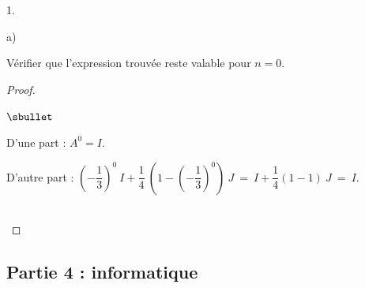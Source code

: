 \begin{noliste}{1.}
\begin{noliste}{a)}
  \item Vérifier que l'expression trouvée reste valable pour $n = 0$.

    \begin{proof}~%
      \begin{noliste}{$\sbullet$}
      \item D'une part : $A^0 = I$.
      \item D'autre part : $\left(-\dfrac{1}{3} \right)^{0} \ I +
        \dfrac{1}{4} \ \left( 1 - \left(-\dfrac{1}{3} \right)^{0}
        \right) \ J \ = \ I + \dfrac{1}{4} (1 - 1) \ J \ = \ I$.
      \end{noliste}
      ~\\[-1.2cm]
    \end{proof}
  \end{noliste}
\end{noliste}

\subsection*{Partie 4 : informatique}

